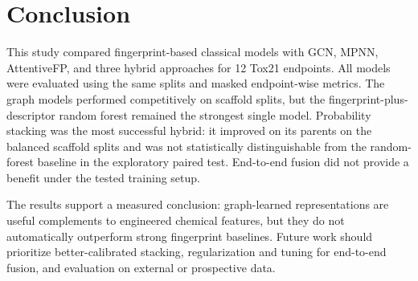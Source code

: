 \section{Conclusion}
\label{sec:conclusion}
This study compared fingerprint-based classical models with GCN, MPNN, AttentiveFP, and
three hybrid approaches for 12 Tox21 endpoints. All models were evaluated using the same
splits and masked endpoint-wise metrics. The graph models performed competitively on
scaffold splits, but the fingerprint-plus-descriptor random forest remained the strongest
single model. Probability stacking was the most successful hybrid: it improved on its
parents on the balanced scaffold splits and was not statistically distinguishable from
the random-forest baseline in the exploratory paired test. End-to-end fusion did not
provide a benefit under the tested training setup.

The results support a measured conclusion: graph-learned representations are useful
complements to engineered chemical features, but they do not automatically outperform
strong fingerprint baselines. Future work should prioritize better-calibrated stacking,
regularization and tuning for end-to-end fusion, and evaluation on external or prospective
data.

